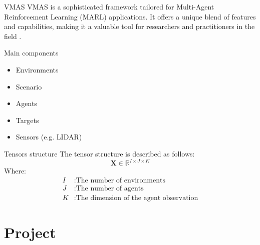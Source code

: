 \documentclass[presentation]{beamer}\mode<presentation>{\usetheme{AMSBolognaFC}}
\begin{document}
\begin{frame}{VMAS}
	VMAS is a sophisticated framework tailored for Multi-Agent Reinforcement Learning (MARL) applications. 
	It offers a unique blend of features and capabilities, making it a valuable 
	tool for researchers and practitioners in the field \cite{bettini2022vmas}.

	\begin{block}{Main components}
		\begin{itemize}
			\item Environments
			\item Scenario
			\item Agents
			\item Targets
			\item Sensors (e.g. LIDAR)
		\end{itemize}
	\end{block}

	\begin{block}{Tensors structure}
		The tensor structure is described as follows:
		\[
		\mathbf{X} \in \mathbb{R}^{I \times J \times K}
		\]
		Where:
		\begin{align*}
		I & : \text{The number of environments} \\
		J & : \text{The number of agents} \\
		K & : \text{The dimension of the agent observation}
		\end{align*}
		
	\end{block}
\end{frame}

\section{Project}
\end{document}
